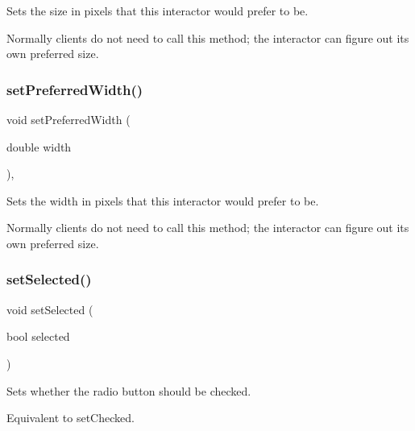 Sets the size in pixels that this interactor would prefer to be. 

Normally clients do not need to call this method; the interactor can figure out its own preferred size. \mbox{\label{classsgl_1_1GInteractor_a3db429ab2fa52efd187eec0ed8cdd9f2}} 
\subsubsection{\texorpdfstring{set\+Preferred\+Width()}{setPreferredWidth()}}
{\footnotesize\ttfamily void set\+Preferred\+Width (\begin{DoxyParamCaption}\item[{double}]{width }\end{DoxyParamCaption})\hspace{0.3cm}{\ttfamily [virtual]}, {\ttfamily [inherited]}}



Sets the width in pixels that this interactor would prefer to be. 

Normally clients do not need to call this method; the interactor can figure out its own preferred size. \mbox{\label{classsgl_1_1GRadioButton_ad42accd39af295a957386c68dac3dcae}} 
\subsubsection{\texorpdfstring{set\+Selected()}{setSelected()}}
{\footnotesize\ttfamily void set\+Selected (\begin{DoxyParamCaption}\item[{bool}]{selected }\end{DoxyParamCaption})\hspace{0.3cm}{\ttfamily [virtual]}}



Sets whether the radio button should be checked. 

Equivalent to set\+Checked. \mbox{\label{classsgl_1_1GInteractor_aca25d49481f9bf5fc8f7df4c086c4ce7}} 

